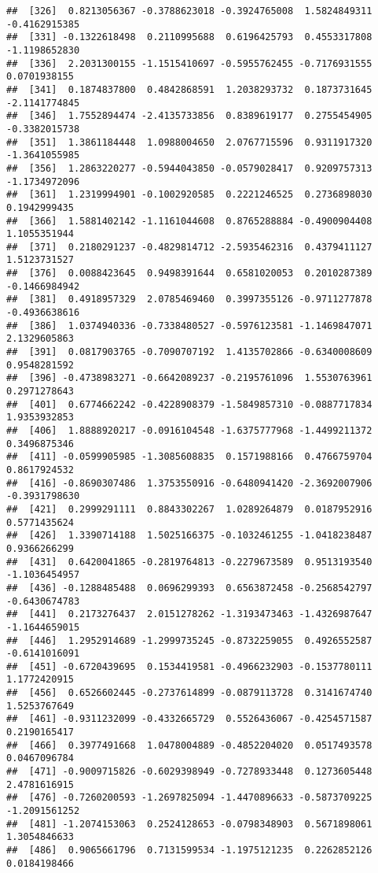 \documentclass[
  12pt,
]{article}
\begin{document}
\begin{verbatim}
##  [326]  0.8213056367 -0.3788623018 -0.3924765008  1.5824849311 -0.4162915385
##  [331] -0.1322618498  0.2110995688  0.6196425793  0.4553317808 -1.1198652830
##  [336]  2.2031300155 -1.1515410697 -0.5955762455 -0.7176931555  0.0701938155
##  [341]  0.1874837800  0.4842868591  1.2038293732  0.1873731645 -2.1141774845
##  [346]  1.7552894474 -2.4135733856  0.8389619177  0.2755454905 -0.3382015738
##  [351]  1.3861184448  1.0988004650  2.0767715596  0.9311917320 -1.3641055985
##  [356]  1.2863220277 -0.5944043850 -0.0579028417  0.9209757313 -1.1734972096
##  [361]  1.2319994901 -0.1002920585  0.2221246525  0.2736898030  0.1942999435
##  [366]  1.5881402142 -1.1161044608  0.8765288884 -0.4900904408  1.1055351944
##  [371]  0.2180291237 -0.4829814712 -2.5935462316  0.4379411127  1.5123731527
##  [376]  0.0088423645  0.9498391644  0.6581020053  0.2010287389 -0.1466984942
##  [381]  0.4918957329  2.0785469460  0.3997355126 -0.9711277878 -0.4936638616
##  [386]  1.0374940336 -0.7338480527 -0.5976123581 -1.1469847071  2.1329605863
##  [391]  0.0817903765 -0.7090707192  1.4135702866 -0.6340008609  0.9548281592
##  [396] -0.4738983271 -0.6642089237 -0.2195761096  1.5530763961  0.2971278643
##  [401]  0.6774662242 -0.4228908379 -1.5849857310 -0.0887717834  1.9353932853
##  [406]  1.8888920217 -0.0916104548 -1.6375777968 -1.4499211372  0.3496875346
##  [411] -0.0599905985 -1.3085608835  0.1571988166  0.4766759704  0.8617924532
##  [416] -0.8690307486  1.3753550916 -0.6480941420 -2.3692007906 -0.3931798630
##  [421]  0.2999291111  0.8843302267  1.0289264879  0.0187952916  0.5771435624
##  [426]  1.3390714188  1.5025166375 -0.1032461255 -1.0418238487  0.9366266299
##  [431]  0.6420041865 -0.2819764813 -0.2279673589  0.9513193540 -1.1036454957
##  [436] -0.1288485488  0.0696299393  0.6563872458 -0.2568542797 -0.6430674783
##  [441]  0.2173276437  2.0151278262 -1.3193473463 -1.4326987647 -1.1644659015
##  [446]  1.2952914689 -1.2999735245 -0.8732259055  0.4926552587 -0.6141016091
##  [451] -0.6720439695  0.1534419581 -0.4966232903 -0.1537780111  1.1772420915
##  [456]  0.6526602445 -0.2737614899 -0.0879113728  0.3141674740  1.5253767649
##  [461] -0.9311232099 -0.4332665729  0.5526436067 -0.4254571587  0.2190165417
##  [466]  0.3977491668  1.0478004889 -0.4852204020  0.0517493578  0.0467096784
##  [471] -0.9009715826 -0.6029398949 -0.7278933448  0.1273605448  2.4781616915
##  [476] -0.7260200593 -1.2697825094 -1.4470896633 -0.5873709225 -1.2091561252
##  [481] -1.2074153063  0.2524128653 -0.0798348903  0.5671898061  1.3054846633
##  [486]  0.9065661796  0.7131599534 -1.1975121235  0.2262852126  0.0184198466

\end{verbatim}
\end{document}
